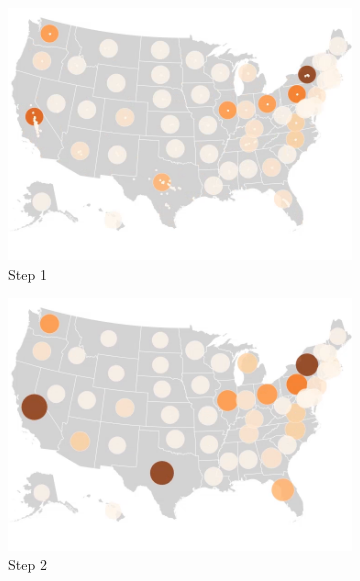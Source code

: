 \begin{figure}
    \begin{subfigure}[b]{0.31\textwidth}
        \centering
        \includegraphics[width=\textwidth]{images/results/dot_cartogram/transition_4.png}
        \caption[]%
        {{\small Step 1}}
    \end{subfigure}
    \hfill
    \begin{subfigure}[b]{0.31\textwidth}
        \centering
        \includegraphics[width=\textwidth]{images/results/dot_cartogram/transition_5.png}
        \caption[]%
        {{\small Step 2}}
    \end{subfigure}
    \hfill
    \begin{subfigure}[b]{0.31\textwidth}
        \centering

\end{subfigure}
\end{figure}
